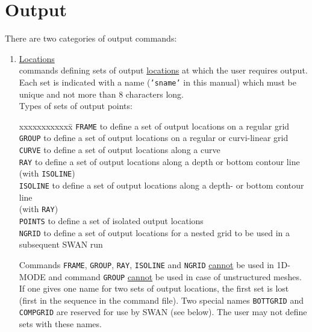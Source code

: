 \documentclass[12pt]{book}
\begin{document}
\section{Output}
There are two categories of output commands:
\begin{enumerate}

\item \underline{Locations}\\
      commands defining sets of output \underline{locations} at which the user requires output. Each set is
      indicated with a name ({\tt {'sname'}} in this manual) which must be unique and not more than 8
      characters long.
      \\[2ex]
      Types of sets of output points:
      \begin{tabbing}
      xxxxxxxxxxxx\= \kill
      {\tt FRAME}   \> to define a set of output locations on a regular grid\\
      {\tt GROUP}   \> to define a set of output locations on a regular or curvi-linear grid\\
      {\tt CURVE}   \> to define a set of output locations along a curve\\
      {\tt RAY}     \> to define a set of output locations along a depth or bottom contour line\+\\
                       (with {\tt ISOLINE})\-\\
      {\tt ISOLINE} \> to define a set of output locations along a depth- or bottom contour line\+\\
                       (with {\tt RAY})\-\\
      {\tt POINTS}  \> to define a set of isolated output locations\\
      {\tt NGRID}   \> to define a set of output locations for a nested grid to be used in a\+\\
                       subsequent SWAN run\-\\
      \end{tabbing}

      Commands {\tt FRAME}, {\tt GROUP}, {\tt RAY}, {\tt ISOLINE} and {\tt NGRID} \underline{cannot} be used in 1D-MODE
      and command {\tt GROUP} \underline{cannot} be used in case of unstructured meshes. If one
      gives one name for two sets of output locations, the first set is lost (first in the sequence in the
      command file). Two special names {\tt BOTTGRID} and {\tt COMPGRID} are reserved for use by SWAN
      (see below). The user may not define sets with these names.


\end{enumerate}
\end{document}
